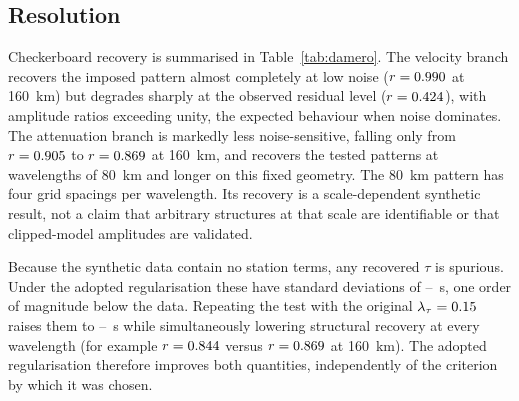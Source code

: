 \documentclass[review,authoryear,longtitle]{elsarticle}
\begin{document}
\subsection{Resolution}

Checkerboard recovery is summarised in Table~\ref{tab:damero}. The
velocity branch recovers the imposed pattern almost completely at low
noise ($r=0.990$ at \SI{160}{\kilo\metre}) but degrades sharply at
the observed residual level ($r=0.424$), with amplitude ratios
exceeding unity, the expected behaviour when noise dominates. The
attenuation branch is markedly less noise-sensitive, falling only from
$r=0.905$ to $r=0.869$ at \SI{160}{\kilo\metre}, and recovers the tested patterns at wavelengths of \SI{80}{\kilo\metre}
and longer on this fixed geometry. The \SI{80}{\kilo\metre} pattern
has four grid spacings per wavelength. Its recovery is a scale-dependent
synthetic result, not a claim that arbitrary structures at that scale
are identifiable or that clipped-model amplitudes are validated.

Because the synthetic data contain no station terms, any recovered
$\tau$ is spurious. Under the adopted regularisation these have standard
deviations of \damTermQObsD--\damTermQObsA~s, one order of magnitude below
the data. Repeating the test with the original
$\lambda_{\tau}=0.15$ raises them to
\damViejoTermQObsD--\damViejoTermQObsA~s while simultaneously lowering
structural recovery at every wavelength (for example $r=0.844$
versus $r=0.869$ at \SI{160}{\kilo\metre}). The adopted regularisation
therefore improves both quantities, independently of the criterion by
which it was chosen.
\end{document}
